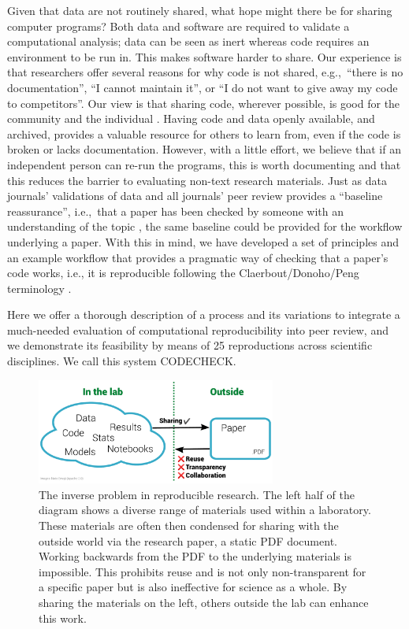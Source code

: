 \documentclass[12pt]{article}
\begin{document}
Given that data are not routinely shared, what hope might there be for
sharing computer programs?  Both data and software are required to
validate a computational analysis; data can be seen as inert whereas
code requires an environment to be run in.  This makes software harder
to share.  Our experience is that researchers offer several reasons
for why code is not shared, e.g.,~``there is no documentation'', ``I
cannot maintain it'', or ``I do not want to give away my code to
competitors''.  Our view is that sharing code, wherever possible, is
good for the community and the individual
\cite{Barnes2010-iv,markowetz_five_2015}.  Having code and data openly
available, and archived, provides a valuable resource for others to
learn from, even if the code is broken or lacks documentation.
However, with a little effort, we believe that if an independent
person can re-run the programs, this is worth documenting and that
this reduces the barrier to evaluating non-text research materials.
Just as data journals' validations of data and all journals' peer
review provides a ``baseline reassurance'', i.e.,~that a paper has
been checked by someone with an understanding of the topic
\cite{fyfe_mission_2019}, the same baseline could be provided for the
workflow underlying a paper.  With this in mind, we have developed a
set of principles and an example workflow that provides a pragmatic
way of checking that a paper's code works, i.e., it is reproducible
following the Claerbout/Donoho/Peng terminology
\cite{barba_terminologies_2018}.

Here we offer a thorough description of a process and its variations
to integrate a much-needed evaluation of computational reproducibility
into peer review, and we demonstrate its feasibility by means of 25
reproductions across scientific disciplines.  We call this system
CODECHECK.

\begin{figure}
  \centering
  \includegraphics[width=0.7\textwidth]{figs/rr.pdf}
  \caption{The inverse problem in reproducible research. The left
  half of the diagram shows a diverse range of materials used
  within a laboratory. These materials are often then
  condensed for sharing with the outside world via the
  research paper, a static PDF document. Working backwards from the
  PDF to the underlying materials is impossible. This prohibits reuse
  and is not only non-transparent for a specific paper but is also 
  ineffective for science as a whole. By sharing the
  materials on the left, others outside the lab can enhance this work.}
  \label{fig:inverse}
\end{figure}
\end{document}
